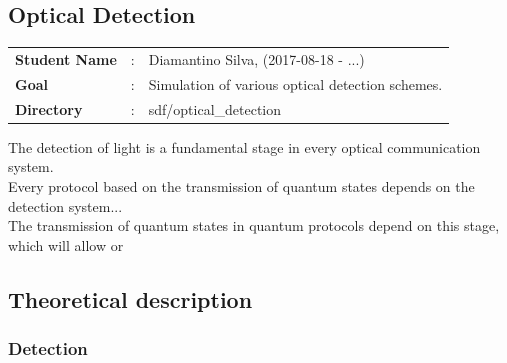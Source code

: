 \begin{bibunit}[plain]

\clearpage
\section{Optical Detection}

\begin{tcolorbox}	
\begin{tabular}{p{2.75cm} p{0.2cm} p{10.5cm}}
\textbf{Student Name}  &:& Diamantino Silva, (2017-08-18 - ...)\\
\textbf{Goal}          &:& Simulation of various optical detection schemes.\\
\textbf{Directory}     &:& sdf/optical\_detection
\end{tabular}
\end{tcolorbox}
%
\vspace{2em}
%
The detection of light is a fundamental stage in every optical communication system.\\
Every protocol based on the transmission of quantum states depends on the detection system...\\
The transmission of quantum states in quantum protocols depend on this stage, which will allow or\\


\subsection{Theoretical description}\label{sec:intro}

\subsubsection{Detection}


\end{bibunit}
